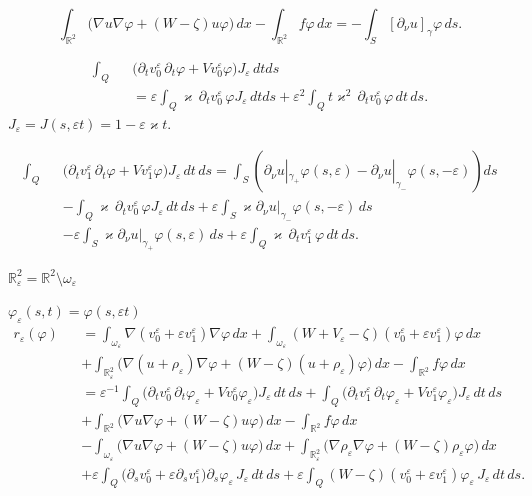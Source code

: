 \documentclass[graybox]{svmult}
\renewcommand{\kappa}{\varkappa}
\newcommand{\Real}{\mathbb R}
\newcommand{\eps}{\varepsilon}
\renewcommand{\phi}{\varphi}
\begin{document}
$$
\int_{\Real^2}\big(\nabla u \nabla \phi+(W-\zeta)u\phi \big)\,dx-\int_{\Real^2}f\phi\,dx=-\int_S [\partial_\nu u]_{\gamma} \phi\,ds.
$$

\begin{eqnarray}\nonumber
\int_Q&&\big(\partial_t v_0^\eps \,\partial_t \phi
+Vv_0^\eps \phi\big)J_\eps\,dt ds\\
&&=\eps \int_Q \kappa\,\partial_t v_0^\eps\, \phi J_\eps\,dt ds+\eps^2\int_Q t\kappa^2\,\partial_t v_0^\eps \,\phi \,dt \,ds.
\end{eqnarray}
$J_\eps=J(s,\eps t)=1-\eps\kappa t$.

\begin{eqnarray}\nonumber
\int_Q&&\big(\partial_t v_1^\eps \,\partial_t \phi
+Vv_1^\eps \phi\big)J_\eps\,dt\, ds=\int_S\left(\partial_\nu u|_{\gamma_+}\phi(s,\eps)-\partial_\nu u|_{\gamma_-}\phi(s,-\eps)\right)ds\\\nonumber
&&-
\int_Q\kappa \,\partial_t v_0^\eps\, \phi J_\eps\,dt\, ds+\eps \int_S \kappa\partial_\nu u|_{\gamma_-}\phi(s,-\eps)\,ds
\\\nonumber
&&-
\eps \int_S \kappa\partial_\nu u|_{\gamma_+}\phi(s,\eps)\,ds
+\eps\int_Q\kappa \,\partial_t v_1^\eps\, \phi\,dt\, ds.
\end{eqnarray}





$\Real^2_\eps=\Real^2\setminus\omega_\eps$

$\phi_\eps(s,t)=\phi(s,\eps t)$
\begin{eqnarray}\nonumber
r_\eps(\phi)&&=
\int_{\omega_\eps}\nabla(v_0^\eps+\eps v_1^\eps)\nabla \phi\,dx
        +\int_{\omega_\eps}(W+V_\eps-\zeta)(v_0^\eps+\eps v_1^\eps) \phi\,dx
\\\nonumber
      &&+
\int_{\Real^2_\eps}\big(\nabla(u+\rho_\eps)\nabla \phi
            + (W-\zeta)(u+\rho_\eps) \phi\big)\,dx
            -\int_{\Real^2}f\phi\,dx
\\\nonumber
&&=\eps^{-1}\int_Q\big(\partial_t v_0^\eps \,\partial_t \phi_\eps
+Vv_0^\eps \phi_\eps\big)J_\eps\,dt\, ds+\int_Q\big(\partial_t v_1^\eps \,\partial_t \phi_\eps
+Vv_1^\eps \phi_\eps\big)J_\eps\,dt\, ds
\\\nonumber
&&+\int_{\Real^2}\big(\nabla u \nabla \phi+(W-\zeta)u\phi \big)\,dx-\int_{\Real^2}f\phi\,dx
\\\nonumber
&&-\int_{\omega_\eps}\big(\nabla u \nabla \phi+(W-\zeta)u\phi \big)\,dx
+\int_{\Real^2_\eps}\big(\nabla\rho_\eps\nabla \phi+(W-\zeta)\rho_\eps \phi\big)\,dx
\\\nonumber
&&+\eps\int_Q\big(\partial_s v_0^\eps+\eps\partial_s v_1^\eps\big) \partial_s \phi_\eps\,J_\eps\,dt\, ds
+\eps \int_Q(W-\zeta)(v_0^\eps+\eps v_1^\eps)\phi_\eps\,J_\eps\,dt\, ds.
\end{eqnarray}
\end{document}
